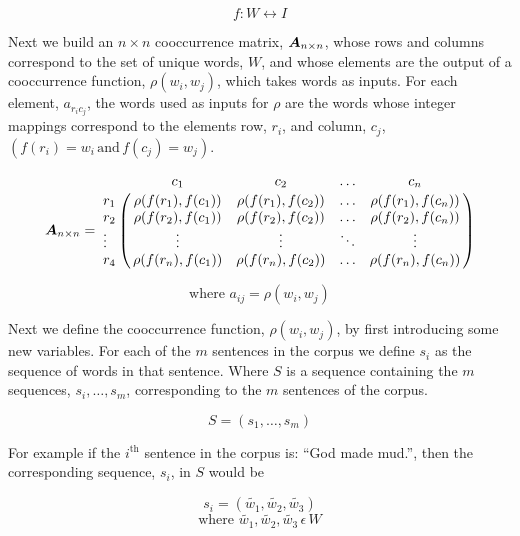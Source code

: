 \documentclass{article}
\begin{document}
	\begin{equation*}
	f: W \leftrightarrow I
	\end{equation*}
	

	Next we build an $n \times n$ cooccurrence matrix, $\boldsymbol{{A}}_{{n} \times {n}}$, whose rows and columns correspond to the set of unique words, $W$, and whose elements are the output of a cooccurrence function, $\rho(w_i, w_j)$, which takes words as inputs. For each element, $a_{r_ic_j}$, the words used as inputs for $\rho$ are the words whose integer mappings correspond to the elements row, $r_i$, and column, $c_j$, $\left( f(r_i) = w_i \, \text{and} \, f(c_j) = w_j \right)$.

\begin{equation*}
\mat{A}{n}{n}=
\bordermatrix{&c_1&c_2&\ldots &c_n\cr
                r_1&\rho(f(r_1), f(c_1)) &  \rho(f(r_1), f(c_2))  & \ldots & \rho(f(r_1), f(c_n))\cr
                r_2&\rho(f(r_2), f(c_1))  &  \rho(f(r_2), f(c_2)) & \ldots & \rho(f(r_2), f(c_n))\cr
                \vdots& \vdots & \vdots & \ddots & \vdots\cr
                r_4&\rho(f(r_n), f(c_1))  &   \rho(f(r_n), f(c_2))   &\ldots & \rho(f(r_n), f(c_n))}
\end{equation*}

\begin{equation*}
\text{where } a_{ij} = \rho(w_i,w_j)
\end{equation*}

Next we define the cooccurrence function, $\rho(w_i, w_j)$, by first introducing some new variables. For each of the $m$ sentences in the corpus we define $s_i$ as the sequence of words in that sentence. Where $S$ is a sequence containing the $m$ sequences, $s_i, \ldots, s_m$, corresponding to the $m$ sentences of the corpus.

\begin{equation*}
S = \left( s_1, \ldots, s_m \right)
\end{equation*}

For example if the $i^{\text{th}}$ sentence in the corpus is: ``God made mud.'', then the corresponding sequence, $s_i$, in $S$ would be

\begin{equation*}
s_i = \left( \tilde{w_1}, \tilde{w_2}, \tilde{w_3} \right)
\end{equation*}
\begin{equation*}
\text{where } \tilde{w_1}, \tilde{w_2}, \tilde{w_3} \, \epsilon \, W
\end{equation*}
\end{document}

